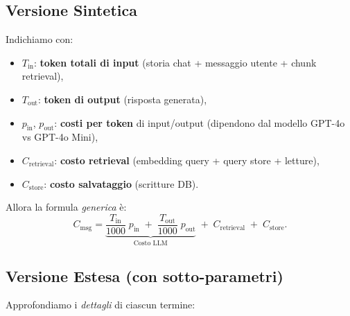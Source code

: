 \documentclass{article}
\begin{document}
\subsection*{Versione Sintetica}
Indichiamo con:

\begin{itemize}
    \item \(T_{\text{in}}\): \textbf{token totali di input} (storia chat + messaggio utente + chunk retrieval),
    \item \(T_{\text{out}}\): \textbf{token di output} (risposta generata),
    \item \(p_{\text{in}}\), \(p_{\text{out}}\): \textbf{costi per token} di input/output (dipendono dal modello GPT-4o vs GPT-4o Mini),
    \item \(C_{\text{retrieval}}\): \textbf{costo retrieval} (embedding query + query store + letture),
    \item \(C_{\text{store}}\): \textbf{costo salvataggio} (scritture DB).
\end{itemize}

Allora la formula \emph{generica} è:
\[
C_{\text{msg}}
= \underbrace{\frac{T_{\text{in}}}{1000} \; p_{\text{in}}
\;+\;
\frac{T_{\text{out}}}{1000} \; p_{\text{out}}}_\text{Costo LLM}
\;+\;
C_{\text{retrieval}}
\;+\;
C_{\text{store}}.
\]

\subsection*{Versione Estesa (con sotto-parametri)}
Approfondiamo i \emph{dettagli} di ciascun termine:
\end{document}
